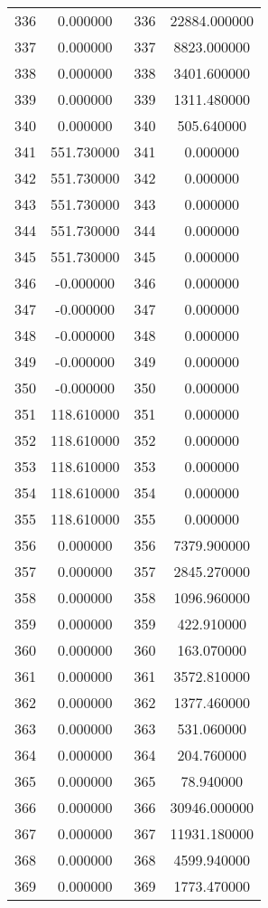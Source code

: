\documentclass[12pt]{article}
\begin{document}
\begin{longtable}{@{}cccc@{}}
336 & 0.000000 & 336 & 22884.000000 \\
337 & 0.000000 & 337 & 8823.000000 \\
338 & 0.000000 & 338 & 3401.600000 \\
339 & 0.000000 & 339 & 1311.480000 \\
340 & 0.000000 & 340 & 505.640000 \\
341 & 551.730000 & 341 & 0.000000 \\
342 & 551.730000 & 342 & 0.000000 \\
343 & 551.730000 & 343 & 0.000000 \\
344 & 551.730000 & 344 & 0.000000 \\
345 & 551.730000 & 345 & 0.000000 \\
346 & -0.000000 & 346 & 0.000000 \\
347 & -0.000000 & 347 & 0.000000 \\
348 & -0.000000 & 348 & 0.000000 \\
349 & -0.000000 & 349 & 0.000000 \\
350 & -0.000000 & 350 & 0.000000 \\
351 & 118.610000 & 351 & 0.000000 \\
352 & 118.610000 & 352 & 0.000000 \\
353 & 118.610000 & 353 & 0.000000 \\
354 & 118.610000 & 354 & 0.000000 \\
355 & 118.610000 & 355 & 0.000000 \\
356 & 0.000000 & 356 & 7379.900000 \\
357 & 0.000000 & 357 & 2845.270000 \\
358 & 0.000000 & 358 & 1096.960000 \\
359 & 0.000000 & 359 & 422.910000 \\
360 & 0.000000 & 360 & 163.070000 \\
361 & 0.000000 & 361 & 3572.810000 \\
362 & 0.000000 & 362 & 1377.460000 \\
363 & 0.000000 & 363 & 531.060000 \\
364 & 0.000000 & 364 & 204.760000 \\
365 & 0.000000 & 365 & 78.940000 \\
366 & 0.000000 & 366 & 30946.000000 \\
367 & 0.000000 & 367 & 11931.180000 \\
368 & 0.000000 & 368 & 4599.940000 \\
369 & 0.000000 & 369 & 1773.470000 \\

\end{longtable}
\end{document}
